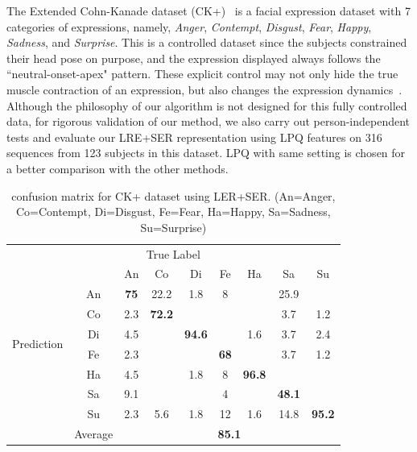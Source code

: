\documentclass[journal]{IEEEtran}
\begin{document}
The Extended Cohn-Kanade dataset (CK+)~\cite{CKplus} is a facial expression dataset with 7 categories of expressions, namely, \textit{Anger}, \textit{Contempt}, \textit{Disgust}, \textit{Fear}, \textit{Happy}, \textit{Sadness}, and \textit{Surprise}. This is a controlled dataset since the subjects constrained their head pose on purpose, and the expression displayed always follows the ``neutral-onset-apex" pattern. These explicit control may not only hide the true muscle contraction of an expression, but also changes the expression dynamics~\cite{Bartlett03,Ekman2005}. Although the philosophy of our algorithm is not designed for this fully controlled data, for rigorous validation of our method, we also carry out person-independent tests and evaluate our LRE+SER representation using LPQ features on 316 sequences from 123 subjects in this dataset. LPQ with same setting is chosen for a better comparison with the other methods. 

\begin{table}[htbp]
\caption{confusion matrix for CK+ dataset using LER+SER.
(An=Anger, Co=Contempt, Di=Disgust, Fe=Fear, Ha=Happy, Sa=Sadness, Su=Surprise)}
\begin{center}
\label{table:CK_result}
\begin{tabular}{c|c|ccccccc|}

\multicolumn{9}{c}{True Label} \\ \cline{2-9}
\multirow{8}{*}{\begin{sideways}Prediction\end{sideways}} && An & Co & Di & Fe & Ha & Sa & Su \\ \cline{2-9}
&An          &\textbf{75} &22.2  &1.8  &8  &  &25.9 &  \\ 
&Co       &2.3  &\textbf{72.2}  &   &   &  &3.7  &1.2 \\ 
&Di        &4.5  &   &\textbf{94.6} &  &1.6 &3.7 &2.4  \\ 
&Fe           &2.3   &   &   &\textbf{68} &  &3.7  &1.2  \\ 
&Ha          &4.5   &   &1.8  &8 &\textbf{96.8} &  &  \\ 
&Sa        &9.1  &  &  &4   &  &\textbf{48.1} & \\ 
&Su       &2.3  &5.6 &1.8  &12 &1.6  &14.8 &\textbf{95.2} \\ \cline{2-9}
&Average &\multicolumn{7}{c|}{\textbf{85.1}} \\ \cline{2-9}

\end{tabular}
\end{center}
\end{table}
\end{document}
